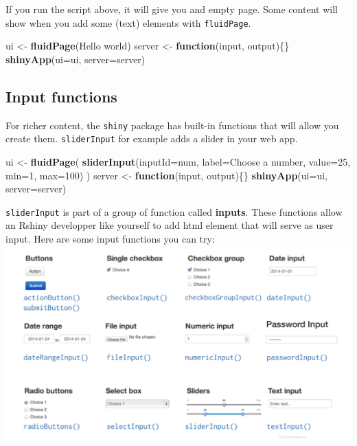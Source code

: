 \documentclass[
]{book}
\newenvironment{Shaded}{\begin{snugshade}}{\end{snugshade}}
\newcommand{\ControlFlowTok}[1]{\textcolor[rgb]{0.13,0.29,0.53}{\textbf{#1}}}
\newcommand{\DataTypeTok}[1]{\textcolor[rgb]{0.13,0.29,0.53}{#1}}
\newcommand{\DecValTok}[1]{\textcolor[rgb]{0.00,0.00,0.81}{#1}}
\newcommand{\KeywordTok}[1]{\textcolor[rgb]{0.13,0.29,0.53}{\textbf{#1}}}
\newcommand{\NormalTok}[1]{#1}
\newcommand{\StringTok}[1]{\textcolor[rgb]{0.31,0.60,0.02}{#1}}
\begin{document}
If you run the script above, it will give you and empty page. Some content will show when you add some (text) elements with \texttt{fluidPage}.

\begin{Shaded}
\begin{Highlighting}[]
\NormalTok{ui \textless{}{-}}\StringTok{ }\KeywordTok{fluidPage}\NormalTok{(}\StringTok{\textquotesingle{}Hello world\textquotesingle{}}\NormalTok{)}
\NormalTok{server \textless{}{-}}\StringTok{ }\ControlFlowTok{function}\NormalTok{(input, output)\{\}}
\KeywordTok{shinyApp}\NormalTok{(}\DataTypeTok{ui=}\NormalTok{ui, }\DataTypeTok{server=}\NormalTok{server)}
\end{Highlighting}
\end{Shaded}

\hypertarget{input-functions}{%
\subsection{Input functions}\label{input-functions}}

For richer content, the \texttt{shiny} package has built-in functions that will allow you create them. \texttt{sliderInput} for example adds a slider in your web app.

\begin{Shaded}
\begin{Highlighting}[]
\NormalTok{ui \textless{}{-}}\StringTok{ }\KeywordTok{fluidPage}\NormalTok{(}
  \KeywordTok{sliderInput}\NormalTok{(}\DataTypeTok{inputId=}\StringTok{\textquotesingle{}num\textquotesingle{}}\NormalTok{,}
              \DataTypeTok{label=}\StringTok{\textquotesingle{}Choose a number\textquotesingle{}}\NormalTok{,}
              \DataTypeTok{value=}\DecValTok{25}\NormalTok{, }\DataTypeTok{min=}\DecValTok{1}\NormalTok{, }\DataTypeTok{max=}\DecValTok{100}\NormalTok{)}
\NormalTok{)}
\NormalTok{server \textless{}{-}}\StringTok{ }\ControlFlowTok{function}\NormalTok{(input, output)\{\}}
\KeywordTok{shinyApp}\NormalTok{(}\DataTypeTok{ui=}\NormalTok{ui, }\DataTypeTok{server=}\NormalTok{server)}
\end{Highlighting}
\end{Shaded}

\texttt{sliderInput} is part of a group of function called \textbf{inputs}. These functions allow an Rshiny developper like yourself to add html element that will serve as user input. Here are some input functions you can try:
\includegraphics{images/inputFunctions.png}
\end{document}
